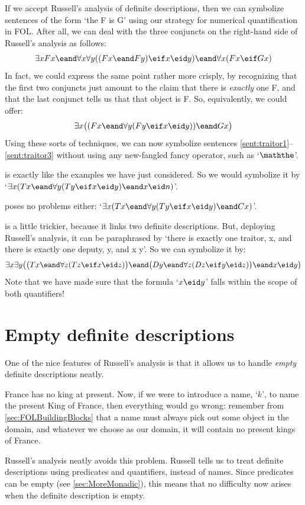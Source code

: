 If we accept Russell's analysis of definite descriptions, then we can symbolize sentences of the form `the F is G' using our strategy for numerical quantification in FOL. After all, we can deal with the three conjuncts on the right-hand side of Russell's analysis as follows:
	$$\exists x Fx \eand \forall x \forall y ((Fx \eand Fy) \eif x \eid y) \eand \forall x (Fx \eif Gx)$$
In fact, we could express the same point rather more crisply, by recognizing that the first two conjuncts just amount to the claim that there is \emph{exactly} one F, and that the last conjunct tells us that that object is F. So, equivalently, we could offer:
	$$\exists x \bigl((Fx \eand \forall y (Fy \eif x \eid y)) \eand Gx\bigr)$$
Using these sorts of techniques, we can now symbolize sentences \cref{sent:traitor1}--\ref{sent:traitor3} without using any new-fangled fancy operator, such as `$\maththe$'.

 is exactly like the examples we have just considered. So we would symbolize it by `$\exists x (Tx \eand \forall y(Ty \eif x \eid y) \eand x \eid n)$'.

 poses no problems either: `$\exists x (Tx \eand \forall y(Ty \eif x \eid y) \eand Cx)$'.

 is a little trickier, because it links two definite descriptions. But, deploying  Russell's analysis, it can be paraphrased by `there is exactly one traitor, x, and there is exactly one deputy, y, and x \eid  y'. So we can symbolize it by:
$$\exists x \exists y \bigl(\bigl(Tx \eand \forall z(Tz \eif x \eid z)\bigr) \eand \bigl(Dy \eand \forall z(Dz \eif y \eid z)\bigr) \eand x \eid  y\bigr)$$
Note that we have made sure that the formula `$x \eid y$' falls within the scope of both quantifiers!

\section{Empty definite descriptions}
One of the nice features of Russell's analysis is that it allows us to handle \emph{empty} definite descriptions neatly.

France has no king at present. Now, if we were to introduce a name, `$k$', to name the present King of France, then everything would go wrong: remember from \cref{sec:FOLBuildingBlocks} that a name must always pick out  some object in the domain, and whatever we choose as our domain, it will contain no present kings of France.

Russell's analysis neatly avoids this problem. Russell tells us to treat definite descriptions using predicates and quantifiers, instead of names. Since predicates can be empty (see \cref{sec:MoreMonadic}), this means that no difficulty now arises when the definite description is empty.

